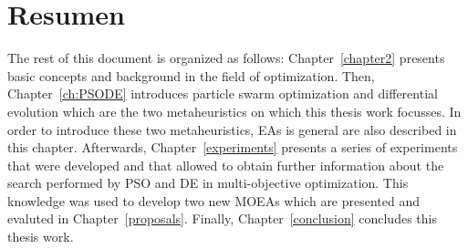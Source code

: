 \section{Resumen}

The rest of this document is organized as follows: Chapter~\ref{chapter2} presents basic concepts and background in the field of optimization. Then, Chapter~\ref{ch:PSODE} introduces particle swarm optimization and differential evolution which are the two metaheuristics on which this thesis work focusses. In order to introduce these two metaheuristics, EAs is general are also described in this chapter. Afterwards, Chapter~\ref{experiments} presents a series of experiments that were developed and that allowed to obtain further information about the search performed by PSO and DE in multi-objective optimization. This knowledge was used to develop two new MOEAs which are presented and evaluted in Chapter~\ref{proposals}. Finally, Chapter~\ref{conclusion} concludes this thesis work. 

